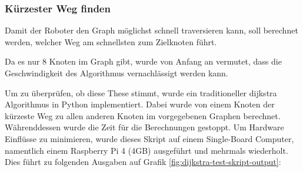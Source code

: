 \subsubsection*{Kürzester Weg finden}

Damit der Roboter den Graph möglichst schnell traversieren kann, soll berechnet werden, welcher Weg am schnellsten zum Zielknoten führt.

Da es nur 8 Knoten im Graph gibt, wurde von Anfang an vermutet, dass die Geschwindigkeit des Algorithmus vernachlässigt werden kann.

Um zu überprüfen, ob diese These stimmt, wurde ein traditioneller \gls{dijkstra} Algorithmus in Python implementiert. Dabei wurde von einem Knoten der kürzeste Weg zu allen anderen Knoten im vorgegebenen Graphen berechnet. Währenddessen wurde die Zeit für die Berechnungen gestoppt. Um Hardware Einflüsse zu minimieren, wurde dieses Skript auf einem Single-Board Computer, namentlich einem Raspberry Pi 4 (4GB) ausgeführt und mehrmals wiederholt. Dies führt zu folgenden Ausgaben auf Grafik \ref{fig:dijkstra-test-skript-output}:

